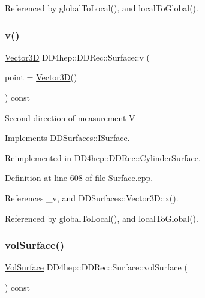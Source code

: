 Referenced by global\+To\+Local(), and local\+To\+Global().

\hypertarget{class_d_d4hep_1_1_d_d_rec_1_1_surface_ab2ff33cf97a5d3b516673b31867dd035}{}\label{class_d_d4hep_1_1_d_d_rec_1_1_surface_ab2ff33cf97a5d3b516673b31867dd035} 
\subsubsection{\texorpdfstring{v()}{v()}}
{\footnotesize\ttfamily \hyperlink{class_d_d_surfaces_1_1_vector3_d}{Vector3D} D\+D4hep\+::\+D\+D\+Rec\+::\+Surface\+::v (\begin{DoxyParamCaption}\item[{const \hyperlink{class_d_d_surfaces_1_1_vector3_d}{Vector3D} \&}]{point = {\ttfamily \hyperlink{class_d_d_surfaces_1_1_vector3_d}{Vector3D}()} }\end{DoxyParamCaption}) const\hspace{0.3cm}{\ttfamily [virtual]}}

Second direction of measurement V 

Implements \hyperlink{class_d_d_surfaces_1_1_i_surface_a61c9f2057ea0383b39ead13a147b2838}{D\+D\+Surfaces\+::\+I\+Surface}.



Reimplemented in \hyperlink{class_d_d4hep_1_1_d_d_rec_1_1_cylinder_surface_a53dbbe89c9d1306d5cafb5a940b8d77f}{D\+D4hep\+::\+D\+D\+Rec\+::\+Cylinder\+Surface}.



Definition at line 608 of file Surface.\+cpp.



References \+\_\+v, and D\+D\+Surfaces\+::\+Vector3\+D\+::x().



Referenced by global\+To\+Local(), and local\+To\+Global().

\hypertarget{class_d_d4hep_1_1_d_d_rec_1_1_surface_acd276a07bb05cf375de83ad3d2a399d5}{}\label{class_d_d4hep_1_1_d_d_rec_1_1_surface_acd276a07bb05cf375de83ad3d2a399d5} 
\subsubsection{\texorpdfstring{vol\+Surface()}{volSurface()}}
{\footnotesize\ttfamily \hyperlink{class_d_d4hep_1_1_d_d_rec_1_1_vol_surface}{Vol\+Surface} D\+D4hep\+::\+D\+D\+Rec\+::\+Surface\+::vol\+Surface (\begin{DoxyParamCaption}{ }\end{DoxyParamCaption}) const\hspace{0.3cm}{\ttfamily [inline]}}



